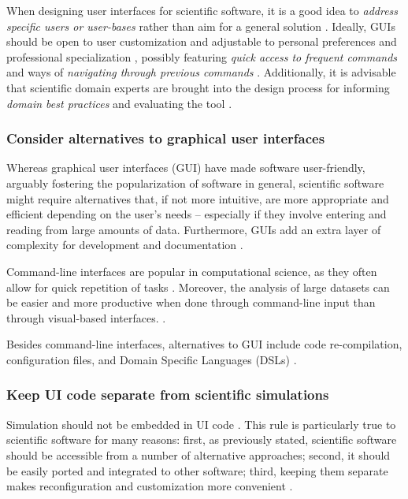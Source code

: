 When designing user interfaces for scientific software, it is a good idea to \emph{address specific users or user-bases} rather than aim for a general solution \cite {Javahery:2004, DeRoure:2009}. Ideally, GUIs should be open to user customization and adjustable to personal preferences and professional specialization \cite{Gertz:1994, Javahery:2004}, possibly featuring \emph{quick access to frequent commands} \cite{Julvez:2014} and ways of \emph{navigating through previous commands} \cite{bestprSC}. 
Additionally, it is advisable that scientific domain experts are brought into the design process for informing \emph{domain best practices} \cite{Schraefel:2004,  DeMatos:2013} and evaluating the tool \cite{Keefe:2010}.

\subsubsection{Consider alternatives to graphical user interfaces}

Whereas graphical user interfaces (GUI) have made software user-friendly, arguably fostering the popularization of software in general, scientific software might require alternatives that, if not more intuitive, are more appropriate and efficient depending on the user's needs – especially if they involve entering and reading from large amounts of data. Furthermore, GUIs add an extra layer of complexity for development and documentation \cite{Smith:2016}. 

Command-line interfaces are popular in computational science, as they often allow for quick repetition of tasks \cite{bestprSC}. Moreover, the analysis of large datasets can be easier and more productive when done through command-line input than through visual-based interfaces. \cite{Springmeyer:1993}. 

Besides command-line interfaces, alternatives to GUI include code re-compilation, configuration files, and Domain Specific Languages (DSLs) \cite{Beg:2016}.
 

\subsubsection{Keep UI code separate from scientific simulations}
Simulation should not be embedded in UI code \cite{Kelly:2009}. This rule is particularly true to scientific software for many reasons: first, as previously stated, scientific software should be accessible from a number of alternative approaches; second, it should be easily ported and integrated to other software; third, keeping them separate makes reconfiguration and customization more convenient \cite{Bastos:2013}.

